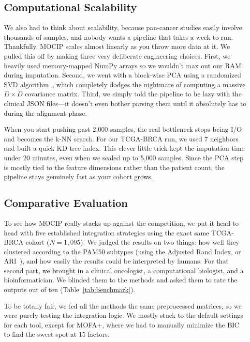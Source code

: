 \documentclass[12pt,a4paper,onecolumn]{article}
\begin{document}
\subsection{Computational Scalability}
We also had to think about scalability, because pan-cancer studies easily involve thousands of samples, and nobody wants a pipeline that takes a week to run. Thankfully, MOCIP scales almost linearly as you throw more data at it. We pulled this off by making three very deliberate engineering choices. First, we heavily used memory-mapped NumPy arrays so we wouldn't max out our RAM during imputation. Second, we went with a block-wise PCA using a randomized SVD algorithm~\cite{pedregosa2011}, which completely dodges the nightmare of computing a massive $D \times D$ covariance matrix. Third, we simply told the pipeline to be lazy with the clinical JSON files---it doesn't even bother parsing them until it absolutely has to during the alignment phase.

When you start pushing past 2,000 samples, the real bottleneck stops being I/O and becomes the k-NN search. For our TCGA-BRCA run, we used 7 neighbors and built a quick KD-tree index. This clever little trick kept the imputation time under 20 minutes, even when we scaled up to 5,000 samples. Since the PCA step is mostly tied to the feature dimensions rather than the patient count, the pipeline stays genuinely fast as your cohort grows.

\subsection{Comparative Evaluation}
To see how MOCIP really stacks up against the competition, we put it head-to-head with five established integration strategies using the exact same TCGA-BRCA cohort ($N=1{,}095$). We judged the results on two things: how well they clustered according to the PAM50 subtypes (using the Adjusted Rand Index, or ARI~\cite{wang2021evaluation}), and how easily the results could be interpreted by humans. For that second part, we brought in a clinical oncologist, a computational biologist, and a bioinformatician. We blinded them to the methods and asked them to rate the outputs out of ten (Table~\ref{tab:benchmark}).

To be totally fair, we fed all the methods the same preprocessed matrices, so we were purely testing the integration logic. We mostly stuck to the default settings for each tool, except for MOFA+, where we had to manually minimize the BIC to find the sweet spot at $15$ factors.
\end{document}
